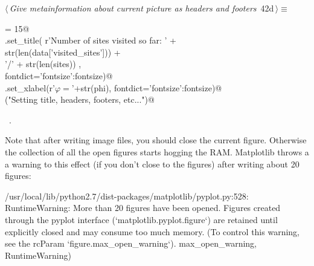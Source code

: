 \documentclass[11.5pt]{report}
\newenvironment{CVerbatim}
 {\singlespacing\center\BVerbatim}
 {\endBVerbatim\endcenter}
\begin{document}
\begin{flushleft} \small\label{scrap57}\raggedright\small
{} $\langle\,${\itshape Give metainformation about current picture as headers and footers}\nobreak\ {\footnotesize {42d}}$\,\rangle\equiv$
\vspace{-1ex}
\begin{list}{}{} \item
\mbox{}\verb@fontsize = 15@\\
\mbox{}\verb@ax.set_title( r'Number of sites visited so far: ' +\@\\
\mbox{}\verb@               str(len(data['visited_sites']))   +\@\\
\mbox{}\verb@               '/' + str(len(sites))           ,  \@\\
\mbox{}\verb@                    fontdict={'fontsize':fontsize})@\\
\mbox{}\verb@ax.set_xlabel(r'$\varphi=$'+str(phi), fontdict={'fontsize':fontsize})@\\
\mbox{}\verb@debug("Setting title, headers, footers, etc...")@\\
\mbox{}\verb@@{\NWsep}
\end{list}
\vspace{-1.5ex}
\footnotesize
\begin{list}{}{\setlength{\itemsep}{-\parsep}\setlength{\itemindent}{-\leftmargin}}
\item \NWtxtMacroRefIn\ .

\item{}
\end{list}
\vspace{4ex}
\end{flushleft}

\vspace{-0.8cm}
Note that after writing image files, you should close the current figure. Otherwise
the collection of all the open figures starts hogging the RAM. Matplotlib throws a
a warning to this effect (if you don't close to the figures) after writing about 
20 figures:

\begin{CVerbatim}[fontsize=\small]
/usr/local/lib/python2.7/dist-packages/matplotlib/pyplot.py:528: RuntimeWarning: 
More than 20 figures have been opened. Figures created through the pyplot interface 
(`matplotlib.pyplot.figure`) are retained until explicitly closed and may consume 
too much memory. (To control this warning, see the rcParam `figure.max_open_warning`).
max_open_warning, RuntimeWarning)
\end{CVerbatim}
\end{document}
